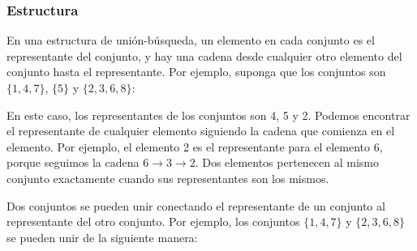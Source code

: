 \subsubsection{Estructura}
En una estructura de unión-búsqueda, un elemento en cada conjunto
es el representante del conjunto,
y hay una cadena desde cualquier otro elemento del
conjunto hasta el representante.
Por ejemplo, suponga que los conjuntos son
$\{1,4,7\}$, $\{5\}$ y $\{2,3,6,8\}$:
\begin{center}
\end{center}
En este caso, los representantes
de los conjuntos son 4, 5 y 2.
Podemos encontrar el representante de cualquier elemento
siguiendo la cadena que comienza en el elemento.
Por ejemplo, el elemento 2 es el representante
para el elemento 6, porque
seguimos la cadena $6 \rightarrow 3 \rightarrow 2$.
Dos elementos pertenecen al mismo conjunto exactamente cuando
sus representantes son los mismos.

Dos conjuntos se pueden unir conectando el
representante de un conjunto al
representante del otro conjunto.
Por ejemplo, los conjuntos
$\{1,4,7\}$ y $\{2,3,6,8\}$
se pueden unir de la siguiente manera:
\begin{center}
\end{center}


